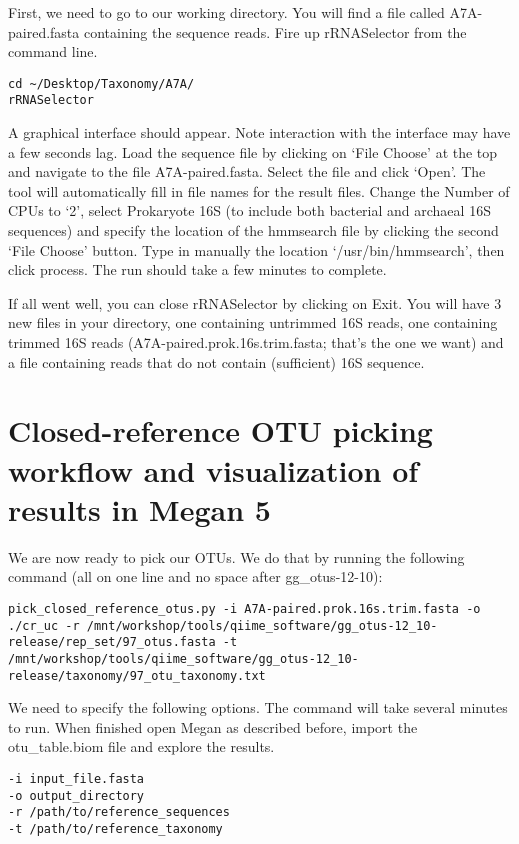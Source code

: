\begin{steps}
First, we need to go to our working directory.
You will find a file called A7A-paired.fasta containing the sequence reads.
Fire up rRNASelector from the command line.

\begin{lstlisting}
cd ~/Desktop/Taxonomy/A7A/
rRNASelector
\end{lstlisting}
\end{steps}

A graphical interface should appear. Note interaction with the interface may have a few seconds lag. Load the sequence file by clicking on ‘File Choose’ at the top and navigate to the file A7A-paired.fasta. Select the file and click ‘Open’. The tool will automatically fill in file names for the result files. Change the Number of CPUs to ‘2’, select Prokaryote 16S (to include both bacterial and archaeal 16S sequences) and specify the location of the hmmsearch file by clicking the second ‘File Choose’ button. Type in manually the location ‘/usr/bin/hmmsearch’, then click process. The run should take a few minutes to complete.

If all went well, you can close rRNASelector by clicking on Exit. You will have 3 new files in your directory, one containing untrimmed 16S reads, one containing trimmed 16S reads (A7A-paired.prok.16s.trim.fasta; that’s the one we want) and a file containing reads that do not contain (sufficient) 16S sequence.

\section{Closed-reference OTU picking workflow and visualization of results in Megan 5}
\begin{steps}
We are now ready to pick our OTUs. We do that by running the following command (all on one line and no space after gg_otus-12-10):

\begin{lstlisting}
pick_closed_reference_otus.py -i A7A-paired.prok.16s.trim.fasta -o ./cr_uc -r /mnt/workshop/tools/qiime_software/gg_otus-12_10-release/rep_set/97_otus.fasta -t /mnt/workshop/tools/qiime_software/gg_otus-12_10-release/taxonomy/97_otu_taxonomy.txt
\end{lstlisting}
\end{steps}

\begin{steps}
We need to specify the following options. 
The command will take several minutes to run. When finished open Megan as described before, import the otu_table.biom file and explore the results.

\begin{lstlisting}
-i input_file.fasta
-o output_directory
-r /path/to/reference_sequences
-t /path/to/reference_taxonomy

\end{lstlisting}
\end{steps}

